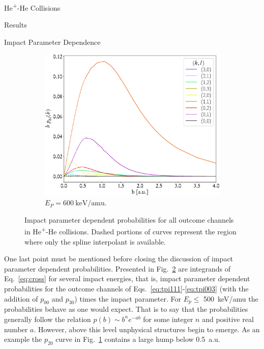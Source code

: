 \documentclass[letterpaper, 11 pt]{report}
\begin{document}
\begin{chapter}{\texorpdfstring{He\textsuperscript{+}}{He+}-He Collisions \label{chap:hephe}}
\begin{section}{Results \label{sec:hephe-disc}}
\begin{subsection}{Impact Parameter Dependence}
\begin{figure}[t]
            \begin{subfigure}{.49\textwidth}
               \centering
               \includegraphics[width=\linewidth]{./images/hephe-bs/pkl-E600.eps}
               \caption{$E_P = 600~\mathrm{keV}/\mathrm{amu}$. \label{fig:pkl600}}
            \end{subfigure}
            \caption[Impact parameter dependent probabilities for all outcome channels in
                     He\textsuperscript{+}-He collisions]
                    {Impact parameter dependent probabilities for all outcome channels in
                     He\textsuperscript{+}-He collisions. Dashed portions of curves represent the region
                     where only the spline interpolant is available. \label{fig:pkl}}
         \end{figure}

         One last point must be mentioned before closing the discussion of impact parameter dependent
         probabilities. Presented in Fig.~\ref{fig:pkl} are integrands of Eq.~\eqref{eq:cross} for
         several impact energies, that is, impact parameter dependent probabilities for the outcome
         channels of Eqs.~\eqref{eq:tpi111}-\eqref{eq:tpi003} (with the addition of $p_{00}$ and
         $p_{30}$) times the impact parameter. For $E_p \leq$ 500~keV/amu the probabilities behave as
         one would expect. That is to say that the probabilities generally follow the relation $p(b)
         \sim b^n e^{-a b}$ for some integer $n$ and positive real number $a$. However, above this level
         unphysical structures begin to emerge. As an example the $p_{20}$ curve in
         Fig.~\ref{fig:pkl600} contains a large hump below 0.5~a.u.


\end{subsection}
\end{section}
\end{chapter}
\end{document}
